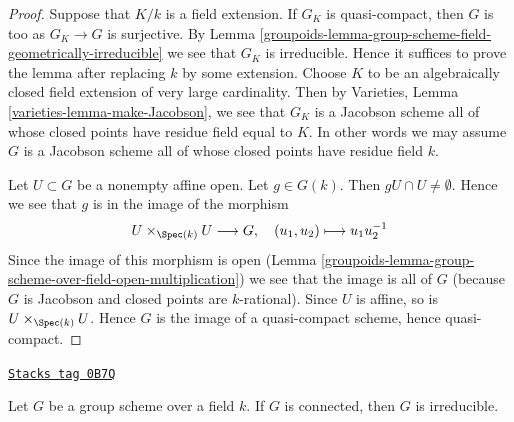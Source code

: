 \begin{proof}

Suppose that $K/k$ is a field extension. If $G_K$
is quasi-compact, then $G$ is too as $G_K \to G$ is surjective.
By Lemma \ref{groupoids-lemma-group-scheme-field-geometrically-irreducible}
we see that $G_K$ is irreducible. Hence it suffices to prove the lemma
after replacing $k$ by some extension. Choose $K$ to be an algebraically
closed field extension of very large cardinality. Then by
Varieties, Lemma \ref{varieties-lemma-make-Jacobson},
we see that $G_K$ is a Jacobson scheme all of whose closed points have residue
field equal to $K$. In other words we may assume $G$ is a Jacobson
scheme all of whose closed points have residue field $k$.

\medskip\noindent
Let $U \subset G$ be a nonempty affine open. Let $g \in G(k)$. Then
$gU \cap U \not = \emptyset$. Hence we see that $g$ is in the image
of the morphism
$$
U \times_{\Spec(k)} U \longrightarrow G, \quad
(u_1, u_2) \longmapsto u_1u_2^{-1}
$$
Since the image of this morphism is open
(Lemma \ref{groupoids-lemma-group-scheme-over-field-open-multiplication})
we see that the image is all of $G$ (because $G$ is Jacobson
and closed points are $k$-rational).
Since $U$ is affine, so is $U \times_{\Spec(k)} U$. Hence $G$ is the
image of a quasi-compact scheme, hence quasi-compact.
\end{proof}

\begin{lemma}
\label{groupoids-lemma-connected-group-scheme-over-field-irreducible}
\href{https://stacks.math.columbia.edu/tag/0B7Q}{\texttt{Stacks tag 0B7Q}}

Let $G$ be a group scheme over a field $k$. If $G$ is connected,
then $G$ is irreducible.
\end{lemma}


